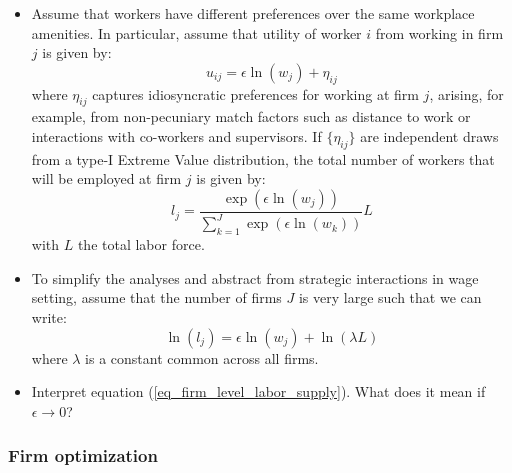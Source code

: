 \documentclass[a4paper,12pt]{article}
\begin{document}
\begin{itemize}

\item Assume that workers have different preferences over the same workplace amenities. In particular, assume that utility of worker $i$ from working in firm $j$ is given by:
\begin{equation} \label{eq_worker_preferences}
    u_{ij} = \epsilon \ln(w_{j}) + \eta_{ij}
\end{equation}
where $\eta_{ij}$ captures idiosyncratic preferences for working at firm $j$, arising, for example, from non-pecuniary match factors such as distance to work or interactions with co-workers and supervisors. If $\{\eta_{ij}\}$ are independent draws from a type-I Extreme Value distribution, the total number of workers that will be employed at firm $j$ is given by:
\begin{equation} 
    l_{j} = \frac{\exp{(\epsilon \ln(w_{j}))}}{\sum_{k=1}^{J} \exp{(\epsilon \ln(w_{k}))}}L
\end{equation}
with $L$ the total labor force.

\item To simplify the analyses and abstract from strategic interactions in wage setting, assume that the number of firms $J$ is very large such that we can write:
\begin{equation} \label{eq_firm_level_labor_supply}
    \ln(l_{j}) = \epsilon \ln(w_{j}) + \ln(\lambda L)
\end{equation}
where $\lambda$ is a constant common across all firms. 

\item Interpret equation (\ref{eq_firm_level_labor_supply}). What does it mean if $ \epsilon \rightarrow 0 $?

\end{itemize}

\subsubsection{Firm optimization}
\end{document}
